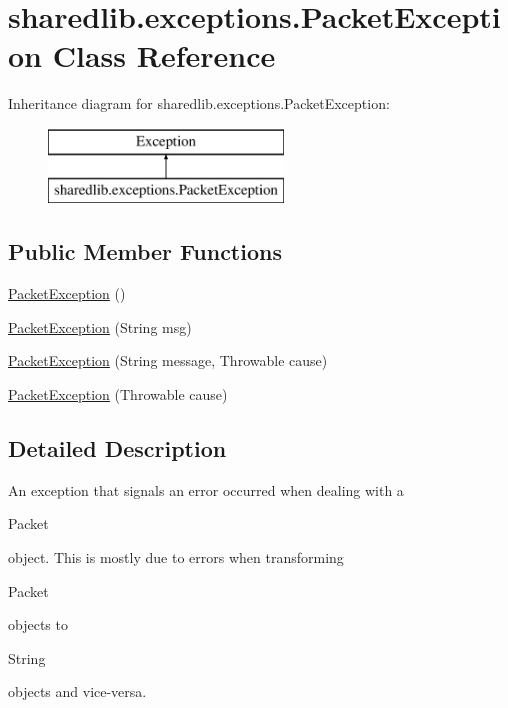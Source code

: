 \hypertarget{classsharedlib_1_1exceptions_1_1_packet_exception}{}\section{sharedlib.\+exceptions.\+Packet\+Exception Class Reference}
\label{classsharedlib_1_1exceptions_1_1_packet_exception}
Inheritance diagram for sharedlib.\+exceptions.\+Packet\+Exception\+:\begin{figure}[H]
\begin{center}
\leavevmode
\includegraphics[height=2.000000cm]{classsharedlib_1_1exceptions_1_1_packet_exception}
\end{center}
\end{figure}
\subsection*{Public Member Functions}
\begin{DoxyCompactItemize}
\item 
\hyperlink{classsharedlib_1_1exceptions_1_1_packet_exception_a9f598444b2ca2eab38c43994fe512095}{Packet\+Exception} ()
\item 
\hyperlink{classsharedlib_1_1exceptions_1_1_packet_exception_ad795dd11b6bb0ec85c35f86a0df9aadc}{Packet\+Exception} (String msg)
\item 
\hyperlink{classsharedlib_1_1exceptions_1_1_packet_exception_a025bed31b5c6215d72292f5a030e014f}{Packet\+Exception} (String message, Throwable cause)
\item 
\hyperlink{classsharedlib_1_1exceptions_1_1_packet_exception_a2b2f12eb7324a67bb7925408173f84ca}{Packet\+Exception} (Throwable cause)
\end{DoxyCompactItemize}


\subsection{Detailed Description}
An exception that signals an error occurred when dealing with a 
\begin{DoxyCode}
Packet 
\end{DoxyCode}
 object. This is mostly due to errors when transforming 
\begin{DoxyCode}
Packet 
\end{DoxyCode}
 objects to
\begin{DoxyCode}
String 
\end{DoxyCode}
 objects and vice-\/versa.

